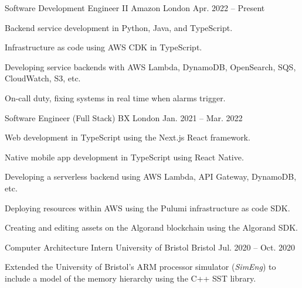 \vspace{-1.1em}


\vspace{-0.2em}

\begin{cventries}

  \cventry
    {Software Development Engineer II} %
    {Amazon} %
    {London} %
    {Apr. 2022 -- Present} %
    {
      \begin{cvitems} %
        \item {Backend service development in Python, Java, and TypeScript.}
        \item {Infrastructure as code using AWS CDK in TypeScript.}
        \item {Developing service backends with AWS Lambda, DynamoDB, OpenSearch, SQS, CloudWatch, S3, etc.}
        \item {On-call duty, fixing systems in real time when alarms trigger.}
      \end{cvitems}
    }

  \cventry
    {Software Engineer (Full Stack)} %
    {BX} %
    {London} %
    {Jan. 2021 -- Mar. 2022} %
    {
      \begin{cvitems} %
        \item {Web development in TypeScript using the Next.js React framework.}
        \item {Native mobile app development in TypeScript using React Native.}
        \item {Developing a serverless backend using AWS Lambda, API Gateway, DynamoDB, etc.}
        \item {Deploying resources within AWS using the Pulumi infrastructure as code SDK.}
        \item {Creating and editing assets on the Algorand blockchain using the Algorand SDK.}
      \end{cvitems}
    }

  \cventry
    {Computer Architecture Intern} %
    {University of Bristol} %
    {Bristol} %
    {Jul. 2020 -- Oct. 2020} %
    {
      \begin{cvitems} %
        \item {Extended the University of Bristol's ARM processor simulator (\textit{SimEng}) to include a model of the memory hierarchy using the C++ SST library.}
      \end{cvitems}
    }


\end{cventries}
